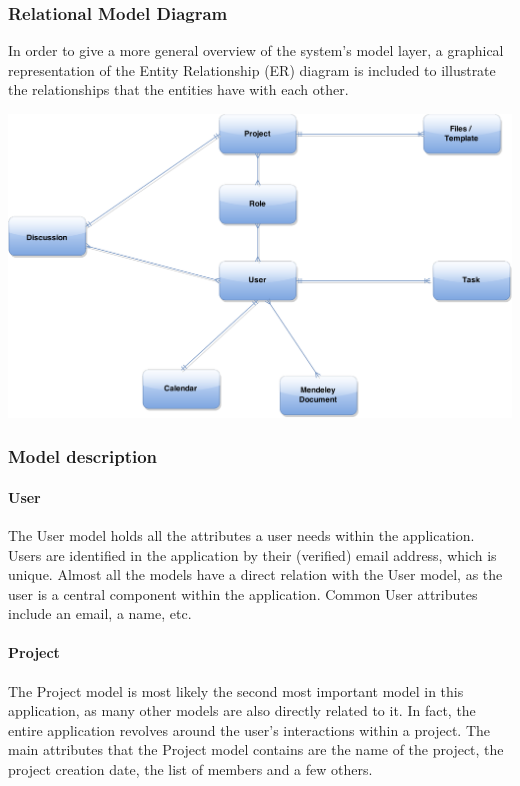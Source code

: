 \subsubsection{Relational Model Diagram}
In order to give a more general overview of the system's model layer, a graphical representation of the Entity Relationship (ER) diagram is included to illustrate the relationships that the entities have with each other.

\begin{center}
\includegraphics[scale=0.3]{./img/dsgn_img/RMA.png}
	
\end{center}

\subsubsection{Model description}
\paragraph{User}
The User model holds all the attributes a user needs within the application. Users are identified in the application by their (verified) email address, which is unique. Almost all the models have a direct relation with the User model, as the user is a central component within the application. Common User attributes include an email, a name, etc.

\paragraph{Project}

The Project model is most likely the second most important model in this application, as many other models are also directly related to it. In fact, the entire application revolves around the user's interactions within a project. The main attributes that the Project model contains are the name of the project, the project creation date, the list of members and a few others.


